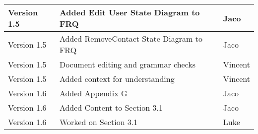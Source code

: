 \begin{center}
\begin{tabular}{|l|l|l|}
\hline
Version 1.5 & Added Edit User State Diagram to FRQ & Jaco\\
\hline
Version 1.5 & Added RemoveContact State Diagram to FRQ&Jaco\\
\hline
Version 1.5 & Document editing and grammar checks & Vincent\\
\hline
Version 1.5 & Added context for understanding & Vincent\\
\hline
Version 1.6 & Added Appendix G& Jaco\\
\hline
Version 1.6 & Added Content to Section 3.1&Jaco\\
\hline
Version 1.6 & Worked on Section 3.1&Luke\\
\hline
\end{tabular}
\end{center}